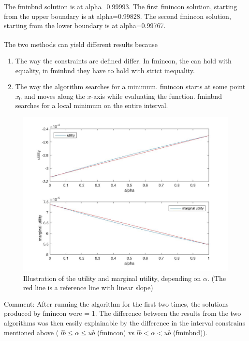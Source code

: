\documentclass{article}
\begin{document}

The fminbnd solution is at alpha=0.99993. The first fmincon solution, starting from the upper boundary is at alpha=0.99828. The second fmincon solution, starting from the lower boundary is at alpha=0.99767.
\\ \\
The two methods can yield different results because
\begin{enumerate} 
\item The way the constraints are defined differ. In fmincon, the can hold with equality, in fminbnd they have to hold with strict inequality. 
\item The way the algorithm searches for a minimum. fmincon starts at some point $x_0$ and moves along the $x$-axis while evaluating the function. fminbnd searches for a local minimum on the entire interval.
\end{enumerate}
\begin{figure}[H]
\includegraphics[width=\textwidth,height=\textheight,keepaspectratio, center]{PS3Q5Sub3bPlot.jpg} 
\caption{Illustration of the utility and marginal utility, depending on $\alpha$. \newline (The red line is a reference line with linear slope)}
\end{figure}
Comment: After running the algorithm for the first two times, the solutions produced by fmincon were = 1. The difference between the results from the two algorithms was then easily explainable by the difference in the interval constrains mentioned above ( $lb \leq \alpha \leq ub $ (fmincon) vs $ lb < \alpha < ub $ (fminbnd)). \\ \\
\end{document}
